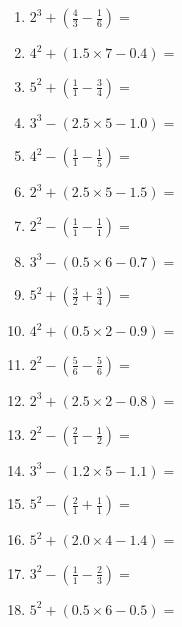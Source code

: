 \documentclass[12pt]{article}
\begin{document}
\begin{enumerate}
\item \large $ 2^{3} + (\frac{4}{3} - \frac{1}{6}) = $ \vspace{1.6cm}
\item \large $ 4^{2} + (1.5 \times 7 - 0.4) = $ \vspace{1.6cm}
\item \large $ 5^{2} + (\frac{1}{1} - \frac{3}{4}) = $ \vspace{1.6cm}
\item \large $ 3^{3} - (2.5 \times 5 - 1.0) = $ \vspace{1.6cm}
\newpage
\item \large $ 4^{2} - (\frac{1}{1} - \frac{1}{5}) = $ \vspace{1.6cm}
\item \large $ 2^{3} + (2.5 \times 5 - 1.5) = $ \vspace{1.6cm}
\item \large $ 2^{2} - (\frac{1}{1} - \frac{1}{1}) = $ \vspace{1.6cm}
\item \large $ 3^{3} - (0.5 \times 6 - 0.7) = $ \vspace{1.6cm}
\item \large $ 5^{2} + (\frac{3}{2} + \frac{3}{4}) = $ \vspace{1.6cm}
\item \large $ 4^{2} + (0.5 \times 2 - 0.9) = $ \vspace{1.6cm}
\item \large $ 2^{2} - (\frac{5}{6} - \frac{5}{6}) = $ \vspace{1.6cm}
\item \large $ 2^{3} + (2.5 \times 2 - 0.8) = $ \vspace{1.6cm}
\item \large $ 2^{2} - (\frac{2}{1} - \frac{1}{2}) = $ \vspace{1.6cm}
\item \large $ 3^{3} - (1.2 \times 5 - 1.1) = $ \vspace{1.6cm}
\newpage
\item \large $ 5^{2} - (\frac{2}{1} + \frac{1}{1}) = $ \vspace{1.6cm}
\item \large $ 5^{2} + (2.0 \times 4 - 1.4) = $ \vspace{1.6cm}
\item \large $ 3^{2} - (\frac{1}{1} - \frac{2}{3}) = $ \vspace{1.6cm}
\item \large $ 5^{2} + (0.5 \times 6 - 0.5) = $ \vspace{1.6cm}

\end{enumerate}
\end{document}

